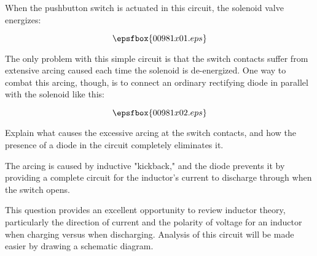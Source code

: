 

When the pushbutton switch is actuated in this circuit, the solenoid valve energizes:

$$\epsfbox{00981x01.eps}$$

The only problem with this simple circuit is that the switch contacts suffer from extensive arcing caused each time the solenoid is de-energized.  One way to combat this arcing, though, is to connect an ordinary rectifying diode in parallel with the solenoid like this:

$$\epsfbox{00981x02.eps}$$

Explain what causes the excessive arcing at the switch contacts, and how the presence of a diode in the circuit completely eliminates it.







The arcing is caused by inductive "kickback," and the diode prevents it by providing a complete circuit for the inductor's current to discharge through when the switch opens.







This question provides an excellent opportunity to review inductor theory, particularly the direction of current and the polarity of voltage for an inductor when charging versus when discharging.  Analysis of this circuit will be made easier by drawing a schematic diagram.



